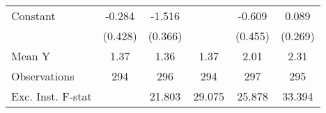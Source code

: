 {\begin{tabular}{l*{5}{c}}
\addlinespace
Constant            &      -0.284         &      -1.516\sym{***}&                     &      -0.609         &       0.089         \\
                    &     (0.428)         &     (0.366)         &                     &     (0.455)         &     (0.269)         \\
\midrule
Mean Y              &        1.37         &        1.36         &        1.37         &        2.01         &        2.31         \\
Observations        &         294         &         296         &         294         &         297         &         295         \\
Exc. Inst. F-stat   &                     &      21.803         &      29.075         &      25.878         &      33.394         \\
\bottomrule
\end{tabular}
}
